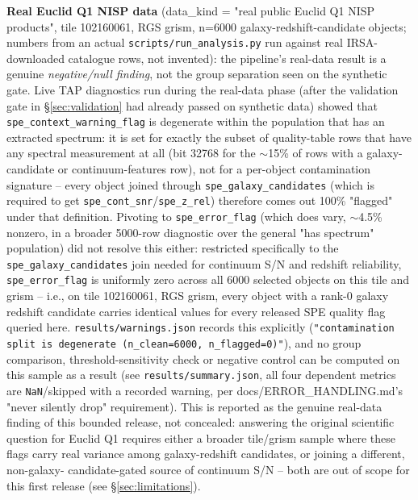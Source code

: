 \documentclass[11pt]{article}
\begin{document}
\textbf{Real Euclid Q1 NISP data} (data\_kind = "real public Euclid Q1 NISP products", tile 102160061, RGS
grism, n=6000 galaxy-redshift-candidate objects; numbers from an actual \texttt{scripts/run\_analysis.py}
run against real IRSA-downloaded catalogue rows, not invented): the pipeline's real-data result is a
genuine \emph{negative/null finding}, not the group separation seen on the synthetic gate.
Live TAP diagnostics run during the real-data phase (after the validation gate in \S\ref{sec:validation}
had already passed on synthetic data) showed that \texttt{spe\_context\_warning\_flag} is degenerate
within the population that has an extracted
spectrum: it is set for exactly the subset of quality-table rows that have any spectral measurement at
all (bit 32768 for the $\sim$15\% of rows with a galaxy-candidate or continuum-features row), not for a
per-object contamination signature -- every object joined through
\texttt{spe\_galaxy\_candidates} (which is required to get \texttt{spe\_cont\_snr}/\texttt{spe\_z\_rel})
therefore comes out 100\% "flagged" under that definition. Pivoting to \texttt{spe\_error\_flag} (which
does vary, $\sim$4.5\% nonzero, in a broader 5000-row diagnostic over the general "has spectrum"
population) did not resolve this either: restricted specifically to the \texttt{spe\_galaxy\_candidates}
join needed for continuum S/N and redshift reliability, \texttt{spe\_error\_flag} is uniformly zero across
all 6000 selected objects on this tile and grism -- i.e., on tile 102160061, RGS grism, every object with
a rank-0 galaxy redshift candidate carries identical values for every released SPE quality flag queried
here. \texttt{results/warnings.json} records this explicitly (\texttt{"contamination split is degenerate
(n\_clean=6000, n\_flagged=0)"}), and no group comparison, threshold-sensitivity check or negative control
can be computed on this sample as a result (see \texttt{results/summary.json}, all four dependent metrics
are \texttt{NaN}/skipped with a recorded warning, per docs/ERROR\_HANDLING.md's "never silently drop"
requirement). This is reported as the genuine real-data finding of this bounded release, not concealed:
answering the original scientific question for Euclid Q1 requires either a broader tile/grism sample where
these flags carry real variance among galaxy-redshift candidates, or joining a different, non-galaxy-
candidate-gated source of continuum S/N -- both are out of scope for this first release (see
\S\ref{sec:limitations}).
\end{document}
